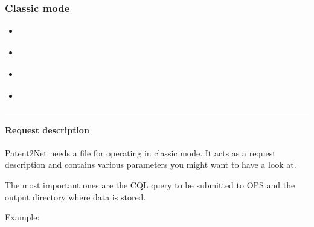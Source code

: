 \documentclass[letterpaper,10pt,english]{sphinxmanual}
\begin{document}
\subsubsection{Classic mode}
\label{\detokenize{usage/classic:classic-mode}}\label{\detokenize{usage/classic::doc}}
\begin{sphinxShadowBox}
\begin{itemize}
\item {} 
\label{\detokenize{usage/classic:id1}}{\hyperref[\detokenize{usage/classic:request-description}]{}}

\item {} 
\label{\detokenize{usage/classic:id2}}{\hyperref[\detokenize{usage/classic:legacy-interface}]{}}

\item {} 
\label{\detokenize{usage/classic:id3}}{\hyperref[\detokenize{usage/classic:modern-interface}]{}}

\item {} 
\label{\detokenize{usage/classic:id4}}{\hyperref[\detokenize{usage/classic:synopsis}]{}}

\end{itemize}
\end{sphinxShadowBox}


\bigskip\hrule\bigskip



\paragraph{Request description}
\label{\detokenize{usage/classic:request-description}}
Patent2Net needs a  file for operating in classic mode.
It acts as a request description and contains various parameters you might want to have a look at.

The most important ones are the CQL query to be submitted to OPS and the output directory where
data is stored.

Example:

\begin{sphinxVerbatim}[commandchars=\\\{\}]
                   

 
\end{sphinxVerbatim}
\end{document}
